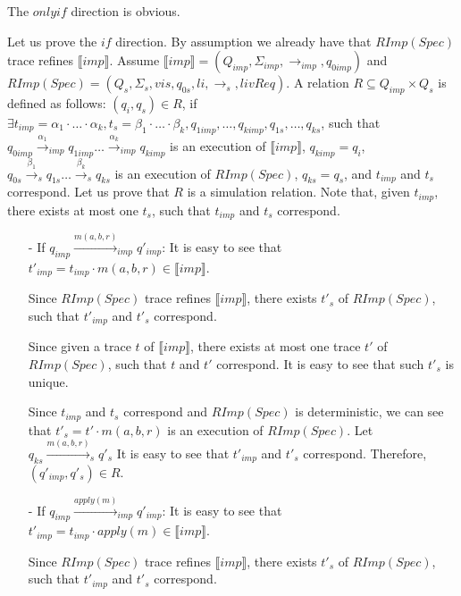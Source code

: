 \forget
{
The $\mathit{only if}$ direction is obvious.

Let us prove the $\mathit{if}$ direction. By assumption we already have that $RImp(Spec)$ trace refines $\llbracket imp \rrbracket$. Assume $\llbracket imp \rrbracket = (Q_{imp},\Sigma_{imp},\rightarrow_{imp},q_{0imp})$ and $RImp(Spec) = (Q_s,\Sigma_s,vis,q_{0s},li,\rightarrow_s,livReq)$. A relation $R \subseteq Q_{imp} \times Q_s$ is defined as follows: $(q_i,q_s) \in R$, if $\exists t_{imp} = \alpha_1 \cdot \ldots \cdot \alpha_k,t_s = \beta_1 \cdot \ldots \cdot \beta_k, q_{1imp}, \ldots, q_{kimp}, q_{1s}, \ldots, q_{ks}$, such that $q_{0imp} {\xrightarrow{\alpha_1}}_{imp} q_{1imp} \ldots {\xrightarrow{\alpha_k}}_{imp} q_{kimp}$ is an execution of $\llbracket imp \rrbracket$, $q_{kimp}=q_i$, $q_{0s} {\xrightarrow{\beta_1}}_s q_{1s} \ldots {\xrightarrow{\beta_k}}_s q_{ks}$ is an execution of $RImp(Spec)$, $q_{ks}=q_s$, and $t_{imp}$ and $t_s$ correspond. Let us prove that $R$ is a simulation relation. Note that, given $t_{imp}$, there exists at most one $t_s$, such that $t_{imp}$ and $t_s$ correspond.

\begin{itemize}
\setlength{\itemsep}{0.5pt}
\item[-] If $q_{imp} {\xrightarrow{m(a,b,r)}}_{imp} q'_{imp}$: It is easy to see that $t'_{imp} = t_{imp} \cdot m(a,b,r) \in \llbracket imp \rrbracket$.

Since $RImp(Spec)$ trace refines $\llbracket imp \rrbracket$, there exists $t'_s$ of $RImp(Spec)$, such that $t'_{imp}$ and $t'_s$ correspond.

Since given a trace $t$ of $\llbracket imp \rrbracket$, there exists at most one trace $t'$ of $RImp(Spec)$, such that $t$ and $t'$ correspond. It is easy to see that such $t'_s$ is unique.

Since $t_{imp}$ and $t_s$ correspond and $RImp(Spec)$ is deterministic, we can see that $t'_s = t' \cdot m(a,b,r)$ is an execution of $RImp(Spec)$. Let $q_{ks} {\xrightarrow{m(a,b,r)}}_s q'_s$ It is easy to see that $t'_{imp}$ and $t'_s$ correspond. Therefore, $(q'_{imp},q'_s) \in R$.

\item[-] If $q_{imp} {\xrightarrow{apply(m)}}_{imp} q'_{imp}$: It is easy to see that $t'_{imp} = t_{imp} \cdot apply(m) \in \llbracket imp \rrbracket$.

Since $RImp(Spec)$ trace refines $\llbracket imp \rrbracket$, there exists $t'_s$ of $RImp(Spec)$, such that $t'_{imp}$ and $t'_s$ correspond.


\end{itemize}}
